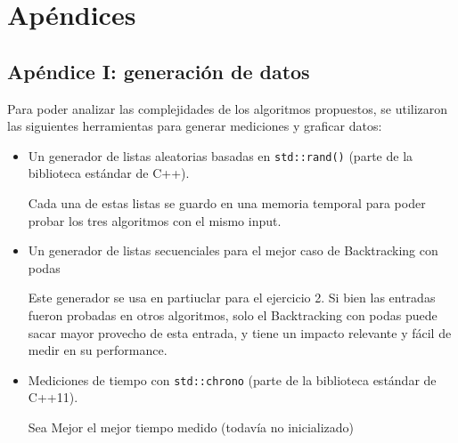 \section{Apéndices}
	\subsection{Apéndice I: generación de datos}
	Para poder analizar las complejidades de los algoritmos propuestos, se utilizaron las siguientes herramientas para generar mediciones y graficar datos:

	\begin{itemize}
		\item Un generador de listas aleatorias basadas en \texttt{std::rand()} (parte de la biblioteca estándar de C++).

		\begin{algorithm}[H]
		\NoCaptionOfAlgo

		\end{algorithm}

		Cada una de estas listas se guardo en una memoria temporal para poder probar los tres algoritmos con el mismo input.

		\item Un generador de listas secuenciales para el mejor caso de Backtracking con podas

		\begin{algorithm}[H]
		\NoCaptionOfAlgo
		

		\end{algorithm}

		Este generador se usa en partiuclar para el ejercicio 2. Si bien las entradas fueron probadas en otros algoritmos, solo el Backtracking con podas puede sacar mayor provecho de esta entrada, y tiene un impacto relevante y fácil de medir en su performance.

		\item Mediciones de tiempo con \texttt{std::chrono} (parte de la biblioteca estándar de C++11).

		\begin{algorithm}[H]
		\NoCaptionOfAlgo

		Sea Mejor el mejor tiempo medido (todavía no inicializado)
\end{algorithm}
\end{itemize}

